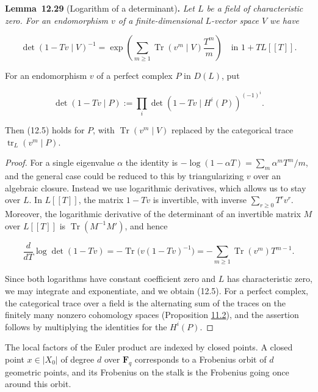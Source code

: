 \documentclass[11pt]{article}
\newenvironment{bpstatement}[2]{\par\addvspace{0.6\baselineskip}\noindent\textbf{#1}#2\textbf{.}\enspace\ignorespaces}
  {\par\addvspace{0.4\baselineskip}}
\newenvironment{bpstatementit}[2]{\begin{bpstatement}{#1}{#2}\itshape\ignorespaces}{\end{bpstatement}}
\begin{document}
\label{bp314}%
\begin{bpstatementit}{Lemma~12.29}{ (Logarithm of a determinant)}
Let \(L\) be a field of characteristic zero. For an endomorphism \(v\) of a finite-dimensional \(L\)-vector space \(V\) we have

\[
\det(1-Tv\mid V)^{-1}
=\exp\left(\sum_{m\geq1}
\operatorname{Tr}(v^m\mid V)\frac{T^m}{m}\right)
\quad\text{in }1+TL[[T]].
\tag{12.5}
\]

For an endomorphism \(v\) of a perfect complex \(P\) in \(D(L)\), put

\[
\det(1-Tv\mid P)
:=\prod_i\det(1-Tv\mid H^i(P))^{(-1)^i}.
\]

Then (12.5) holds for \(P\), with \(\operatorname{Tr}(v^m\mid V)\) replaced by the categorical trace \(\operatorname{tr}_L(v^m\mid P)\).
\end{bpstatementit}

\begin{proof}[{Proof}]\label{bp315}%
For a single eigenvalue \(\alpha\) the identity is \(-\log(1-\alpha T)=\sum_m\alpha^mT^m/m\), and the general case could be reduced to this by triangularizing \(v\) over an algebraic closure. Instead we use logarithmic derivatives, which allows us to stay over \(L\). In \(L[[T]]\), the matrix \(1-Tv\) is invertible, with inverse \(\sum_{r\geq0}T^rv^r\). Moreover, the logarithmic derivative of the determinant of an invertible matrix \(M\) over \(L[[T]]\) is \(\operatorname{Tr}(M^{-1}M')\), and hence

\[
\frac{d}{dT}\log\det(1-Tv)
=-\operatorname{Tr}\bigl(v(1-Tv)^{-1}\bigr)
=-\sum_{m\geq1}\operatorname{Tr}(v^m)T^{m-1}.
\]

Since both logarithms have constant coefficient zero and \(L\) has characteristic zero, we may integrate and exponentiate, and we obtain (12.5). For a perfect complex, the categorical trace over a field is the alternating sum of the traces on the finitely many nonzero cohomology spaces (Proposition \hyperref[bp176]{11.2}), and the assertion follows by multiplying the identities for the \(H^i(P)\).
\end{proof}

\label{bp316}%
The local factors of the Euler product are indexed by closed points. A closed point \(x\in|X_0|\) of degree \(d\) over \(\mathbf F_q\) corresponds to a Frobenius orbit of \(d\) geometric points, and its Frobenius on the stalk is the Frobenius going once around this orbit.
\end{document}
